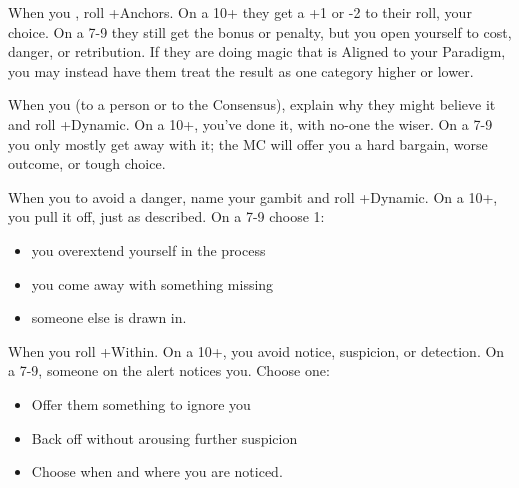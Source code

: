 \begin{multicols}{3}
\begin{move}
  \end{move}

  \SEPARATOR

  \begin{move}
    When you , roll +Anchors. On a 10+ they get a +1 or -2 to their roll, your choice. On a 7-9 they still get the bonus or penalty, but you open yourself to cost, danger, or retribution. If they are doing magic that is Aligned to your Paradigm, you may instead have them treat the result as one category higher or lower.

  \end{move}

  \columnbreak
    
  \begin{move}
    When you  (to a person or to the Consensus), explain why they might believe it and roll +Dynamic. On a 10+, you’ve done it, with no-one the wiser. On a 7-9 you only mostly get away with it; the MC will offer you a hard bargain, worse outcome, or tough choice.


  \end{move}

  \vspace{1em}
  
  \SEPARATOR

  \begin{move}
    When you  to avoid a danger, name your gambit and roll +Dynamic. On a 10+, you pull it off, just as described. On a 7-9 choose 1:

    \begin{itemize}
      \setlength\itemsep{0em}
    \item you overextend yourself in the process
    \item you come away with something missing
    \item someone else is drawn in.
    \end{itemize}
  \end{move}

  \SEPARATOR

  \begin{move}
    When you  roll +Within. On a 10+, you avoid notice, suspicion, or detection. On a 7-9, someone on the alert notices you. Choose one:

    \begin{itemize}
      \setlength\itemsep{0em}
    \item Offer them something to ignore you
    \item Back off without arousing further suspicion
    \item Choose when and where you are noticed.
    \end{itemize}
  \end{move}


\end{multicols}

